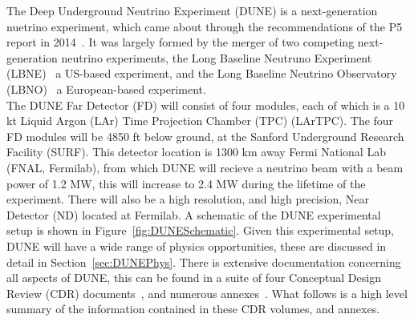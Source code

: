 The Deep Underground Neutrino Experiment (DUNE) is a next-generation nuetrino experiment, which came about through the recommendations of the P5 report in 2014~\citep{P5Doc}. It was largely formed by the merger of two competing next-generation neutrino experiments, the Long Baseline Neutruno Experiment (LBNE)~\citep{LBNE_CDR1, LBNE_CDR2, LBNE_CDR3, LBNE_CDR4, LBNE_CDR5, LBNE_CDR6} a US-based experiment, and the Long Baseline Neutrino Observatory (LBNO)~\citep{LBNO_EOI} a European-based experiment. \\

The DUNE Far Detector (FD) will consist of four modules, each of which is a 10 kt Liquid Argon (LAr) Time Projection Chamber (TPC) (LArTPC). The four FD modules will be 4850 ft below ground, at the Sanford Underground Research Facility (SURF). This detector location is 1300 km away Fermi National Lab (FNAL, Fermilab), from which DUNE will recieve a neutrino beam with a beam power of 1.2 MW, this will increase to 2.4 MW during the lifetime of the experiment. There will also be a high resolution, and high precision, Near Detector (ND) located at Fermilab. A schematic of the DUNE experimental setup is shown in Figure~\ref{fig:DUNESchematic}. Given this experimental setup, DUNE will have a wide range of physics opportunities, these are discussed in detail in Section~\ref{sec:DUNEPhys}. There is extensive documentation concerning all aspects of DUNE, this can be found in a suite of four Conceptual Design Review (CDR) documents~\citep{DUNECDR_V1, DUNECDR_V2, DUNECDR_V3, DUNECDR_V4}, and numerous annexes~\citep{DUNEAtWork}. What follows is a high level summary of the information contained in these CDR volumes, and annexes. \\ 

